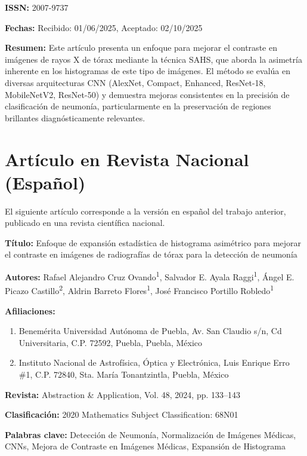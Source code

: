 \textbf{ISSN:} 2007-9737

\textbf{Fechas:} Recibido: 01/06/2025, Aceptado: 02/10/2025

\textbf{Resumen:} Este artículo presenta un enfoque para mejorar el contraste en imágenes de rayos X de tórax mediante la técnica SAHS, que aborda la asimetría inherente en los histogramas de este tipo de imágenes. El método se evalúa en diversas arquitecturas CNN (AlexNet, Compact, Enhanced, ResNet-18, MobileNetV2, ResNet-50) y demuestra mejoras consistentes en la precisión de clasificación de neumonía, particularmente en la preservación de regiones brillantes diagnósticamente relevantes.



\section{Artículo en Revista Nacional (Español)}

El siguiente artículo corresponde a la versión en español del trabajo anterior, publicado en una revista científica nacional.

\textbf{Título:} Enfoque de expansión estadística de histograma asimétrico para mejorar el contraste en imágenes de radiografías de tórax para la detección de neumonía

\textbf{Autores:} Rafael Alejandro Cruz Ovando\textsuperscript{1}, Salvador E. Ayala Raggi\textsuperscript{1}, Ángel E. Picazo Castillo\textsuperscript{2}, Aldrin Barreto Flores\textsuperscript{1}, José Francisco Portillo Robledo\textsuperscript{1}

\textbf{Afiliaciones:}
\begin{enumerate}
\item Benemérita Universidad Autónoma de Puebla, Av. San Claudio s/n, Cd Universitaria, C.P. 72592, Puebla, Puebla, México
\item Instituto Nacional de Astrofísica, Óptica y Electrónica, Luis Enrique Erro \#1, C.P. 72840, Sta. María Tonantzintla, Puebla, México
\end{enumerate}

\textbf{Revista:} Abstraction \& Application, Vol. 48, 2024, pp. 133–143

\textbf{Clasificación:} 2020 Mathematics Subject Classification: 68N01

\textbf{Palabras clave:} Detección de Neumonía, Normalización de Imágenes Médicas, CNNs, Mejora de Contraste en Imágenes Médicas, Expansión de Histograma

